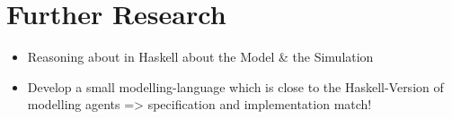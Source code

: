 \section{Further Research}
\begin{itemize}
	\item Reasoning about in Haskell about the Model \& the Simulation
	\item Develop a small modelling-language which is close to the Haskell-Version of modelling agents => specification and implementation match!
\end{itemize}